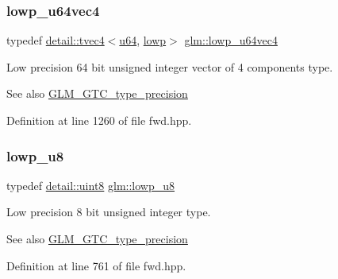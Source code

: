 \subsubsection{\texorpdfstring{lowp\+\_\+u64vec4}{lowp\_u64vec4}}
{\footnotesize\ttfamily typedef \hyperlink{structglm_1_1detail_1_1tvec4}{detail\+::tvec4}$<$\hyperlink{group__gtc__type__precision_ga71cedd4972f9cb1a5e14dfe5ab83ecd7}{u64}, \hyperlink{namespaceglm_a0f04f086094c747d227af4425893f545ae161af3fc695e696ce3bf69f7332bc2d}{lowp}$>$ \hyperlink{group__gtc__type__precision_ga1dc6d791a39dc52ee296a891d5b9b084}{glm\+::lowp\+\_\+u64vec4}}

Low precision 64 bit unsigned integer vector of 4 components type. \begin{DoxySeeAlso}{See also}
\hyperlink{group__gtc__type__precision}{G\+L\+M\+\_\+\+G\+T\+C\+\_\+type\+\_\+precision} 
\end{DoxySeeAlso}


Definition at line 1260 of file fwd.\+hpp.

\mbox{\label{group__gtc__type__precision_gae63f942c49a30dbf266b2f13f3efe257}} 
\subsubsection{\texorpdfstring{lowp\+\_\+u8}{lowp\_u8}}
{\footnotesize\ttfamily typedef \hyperlink{namespaceglm_1_1detail_aef2588f97d090cc19fbbe0c74fe17c8f}{detail\+::uint8} \hyperlink{group__gtc__type__precision_gae63f942c49a30dbf266b2f13f3efe257}{glm\+::lowp\+\_\+u8}}

Low precision 8 bit unsigned integer type. \begin{DoxySeeAlso}{See also}
\hyperlink{group__gtc__type__precision}{G\+L\+M\+\_\+\+G\+T\+C\+\_\+type\+\_\+precision} 
\end{DoxySeeAlso}


Definition at line 761 of file fwd.\+hpp.

\mbox{\label{group__gtc__type__precision_gaee3cba2c93fa8cb7295671908995197c}} 
